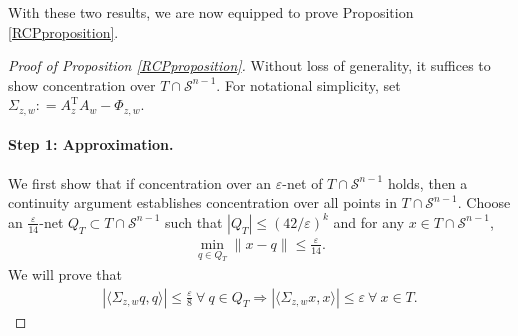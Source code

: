 \documentclass[11pt]{article}
\renewcommand{\epsilon}{\varepsilon}
\renewcommand{\top}{{\mathrm{T}}}
\theoremstyle{remark}
\begin{document}
\noindent With these two results, we are now equipped to prove Proposition \ref{RCPproposition}.

\begin{proof}[Proof of Proposition \ref{RCPproposition}]

 Without loss of generality, it suffices to show concentration over $T \cap \mathcal{S}^{n-1}$. For notational simplicity, set $\Sigma_{z,w} : = A_z^\top A_w - \Phi_{z,w}$.

\paragraph{Step 1: Approximation.} We first show that if concentration over an $\epsilon$-net of $T \cap \mathcal{S}^{n-1}$ holds, then a continuity argument establishes concentration over all points in $T \cap \mathcal{S}^{n-1}$.  Choose an $\frac{\epsilon}{14}$-net $Q_T \subset T \cap \mathcal{S}^{n-1}$ such that $|Q_T| \leqslant (42/\epsilon)^k$ and for any $x \in T \cap \mathcal{S}^{n-1}$, \begin{align}
\min_{q \in Q_T}\|x - q\| \leqslant \frac{\epsilon}{14}. \label{min_bound}
\end{align}  We will prove that \begin{align}
    |\langle \Sigma_{z,w}q,q\rangle| \leqslant \frac{\epsilon}{8}\ \forall\ q \in Q_T \Longrightarrow |\langle \Sigma_{z,w}x,x\rangle| \leqslant \epsilon\ \forall\ x \in T. \label{conc_over_Q_implies_T}
\end{align} 


\end{proof}
\end{document}
